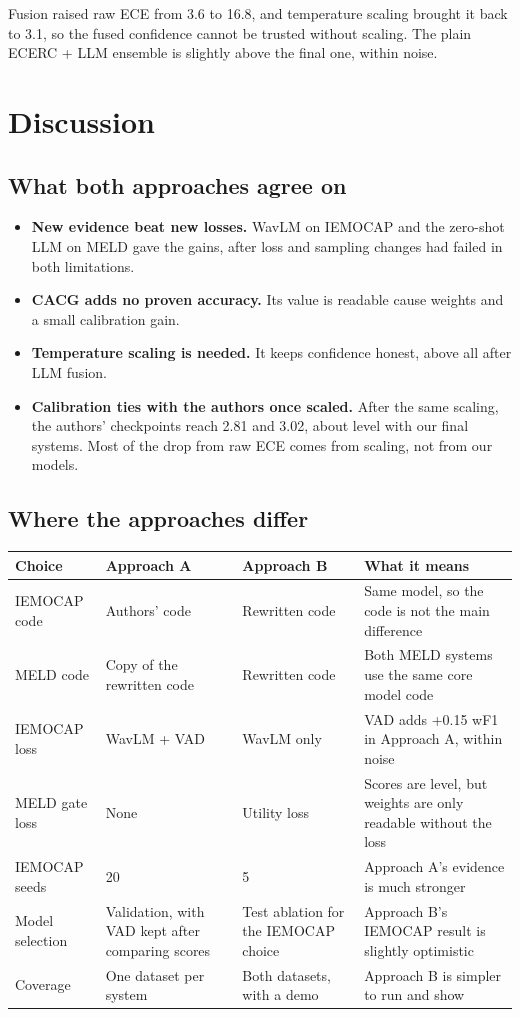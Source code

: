 \documentclass[11pt,a4paper]{article}
\begin{document}
Fusion raised raw ECE from 3.6 to 16.8, and temperature scaling brought it back to 3.1, so the fused confidence cannot be trusted without scaling. The plain ECERC + LLM ensemble is slightly above the final one, within noise.

\section{Discussion}
\label{sec:discussion}

\subsection{What both approaches agree on}

\begin{itemize}
  \item \textbf{New evidence beat new losses.} WavLM on IEMOCAP and the zero-shot LLM on MELD gave the gains, after loss and sampling changes had failed in both limitations.
  \item \textbf{CACG adds no proven accuracy.} Its value is readable cause weights and a small calibration gain.
  \item \textbf{Temperature scaling is needed.} It keeps confidence honest, above all after LLM fusion.
  \item \textbf{Calibration ties with the authors once scaled.} After the same scaling, the authors' checkpoints reach 2.81 and 3.02, about level with our final systems. Most of the drop from raw ECE comes from scaling, not from our models.
\end{itemize}

\subsection{Where the approaches differ}

{\small
\begin{longtable}{L{2.4cm}L{3.6cm}L{3.6cm}L{6.2cm}}
\toprule
Choice & Approach A & Approach B & What it means \\
\midrule
\endhead
\bottomrule
\endlastfoot
IEMOCAP code & Authors' code & Rewritten code & Same model, so the code is not the main difference \\
MELD code & Copy of the rewritten code & Rewritten code & Both MELD systems use the same core model code \\
IEMOCAP loss & WavLM + VAD & WavLM only & VAD adds +0.15 wF1 in Approach A, within noise \\
MELD gate loss & None & Utility loss & Scores are level, but weights are only readable without the loss \\
IEMOCAP seeds & 20 & 5 & Approach A's evidence is much stronger \\
Model selection & Validation, with VAD kept after comparing scores & Test ablation for the IEMOCAP choice & Approach B's IEMOCAP result is slightly optimistic \\
Coverage & One dataset per system & Both datasets, with a demo & Approach B is simpler to run and show \\
\end{longtable}
}
\end{document}
